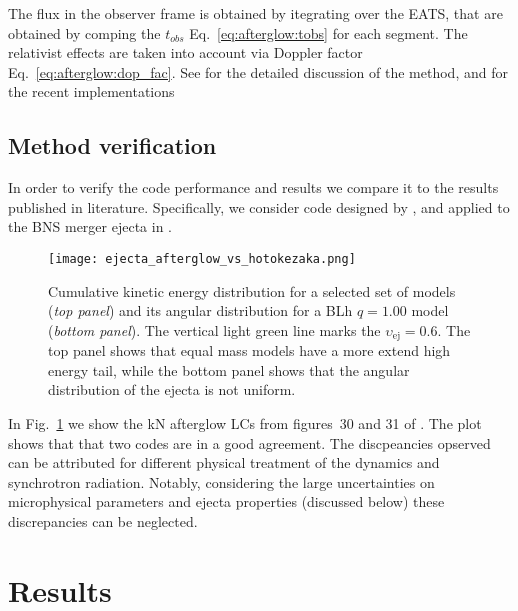 The flux in the observer frame is obtained by itegrating over the \ac{EATS}, 
that are obtained by comping the $t_{obs}$ Eq.~\eqref{eq:afterglow:tobs} for each
segment. The relativist effects are taken into account via 
Doppler factor Eq.~\eqref{eq:afterglow:dop_fac}.
See \citet{Salmonson:2003} for the detailed discussion of the method, 
and \citet{Lamb:2018ohw,Fernandez:2021xce} for the recent implementations


\subsection{Method verification}

In order to verify the code performance and results we compare it to the results 
published in literature. Specifically, we consider code designed by \citet{Hotokezaka:2015eja},
and applied to the \ac{BNS} merger ejecta in \citet{Radice:2018pdn}.

\begin{figure}%
    \centering 
    \texttt{[image: ejecta\_afterglow\_vs\_hotokezaka.png]}
    \caption{
        Cumulative kinetic energy distribution for a selected set of models (\textit{top panel}) 
        and its angular distribution for a BLh $q=1.00$ model (\textit{bottom panel}).
        The vertical light green line marks the $\upsilon_{\text{ej}}=0.6$.
        The top panel shows that equal mass models have a more extend high energy tail,
        while the bottom panel shows that the angular distribution of the ejecta is not 
        uniform.
    } 
    \label{fig:afg_test}
\end{figure}

In Fig.~\ref{fig:afg_test} we show the \ac{kN} afterglow \acp{LC} from 
figures~30 and 31 of \citet{Radice:2018pdn}. The plot shows that that two codes
are in a good agreement. The discpeancies opserved can be attributed for different 
physical treatment of the \blast{} dynamics and synchrotron radiation. 
Notably, considering the large uncertainties on microphysical parameters and 
ejecta properties (discussed below) these discrepancies can be neglected.



\section{Results}

